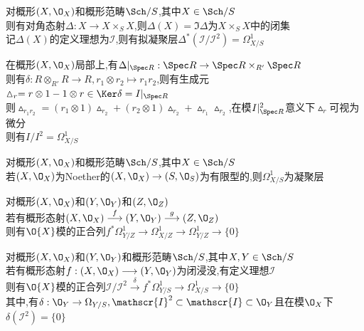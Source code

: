 \begin{dingyi}
对概形$(X,\O_{X})$和概形范畴$\Sch/S$,其中$X\in \Sch/S$\\
则有对角态射$\Delta:X\to X\times_{S}X$,则$\Delta(X)=\Im\Delta$为$X\times_{S}X$中的闭集\\
记$\Delta(X)$的定义理想为$\mathscr{I}$,则有拟凝聚层$\Delta^*(\mathscr{I}/\mathscr{I}^2)=\Omega_{X/S}^{1}$
\end{dingyi}

\begin{zhu}
在概形$(X,\O_{X})$局部上,有$\Delta|_{\Spec R}:\Spec R\to \Spec R\times_{R'}\Spec R$\\
则有$\delta:R\otimes_{R'}R\to R,r_1\otimes r_2\mapsto r_1r_2$,则有生成元$\vartriangle_{r}= r\otimes 1-1\otimes r\in\Ker \delta=I|_{\Spec R}$\\
则$\vartriangle_{r_1r_2}=(r_1\otimes1)\vartriangle_{r_2}+(r_2\otimes1)\vartriangle_{r_2}+\vartriangle_{r_1}\vartriangle_{r_2}$,在模$I|_{\Spec R}^2$意义下$\vartriangle_{r}$可视为微分\\
则有$I/I^2=\Omega_{X/S}^{1}$
\end{zhu}

\begin{dingli}
对概形$(X,\O_{X})$和概形范畴$\Sch/S$,其中$X\in \Sch/S$\\
若$(X,\O_{X})$为Noether的$(X,\O_{X})\to (S,\O_{S})$为有限型的,则$\Omega_{X/S}^{1}$为凝聚层
\end{dingli}

\begin{dingli}
对概形$(X,\O_{X})$和$(Y,\O_{Y})$和$(Z,\O_{Z})$\\
若有概形态射$(X,\O_{X})\stackrel{f}{\longrightarrow}(Y,\O_{Y})\stackrel{g}{\longrightarrow}(Z,\O_{Z})$\\
则有$\O{X}$模的正合列$f^{*}\Omega_{Y/Z}^{1}\longrightarrow\Omega_{X/Z}^{1}\longrightarrow\Omega_{Y/Z}^{1}\longrightarrow\{0\}$
\end{dingli}

\begin{dingli}
对概形$(X,\O_{X})$和$(Y,\O_{Y})$和概形范畴$\Sch/S$,其中$X,Y\in \Sch/S$\\
若有概形态射$f:(X,\O_{X})\longrightarrow(Y,\O_{Y})$为闭浸没,有定义理想$\mathscr{I}$\\
则有$\O{X}$模的正合列$\mathscr{I}/\mathscr{I}^2\stackrel{\delta}{\longrightarrow}f^{*}\Omega_{Y/S}^{1}\longrightarrow\Omega_{X/S}^{1}\longrightarrow\{0\}$\\
其中,有$\delta:\O_{Y}\to\Omega_{Y/S},\mathscr{I}^2\subset \mathscr{I}\subset \O_{Y}$且在模$\O_{X}$下$\delta(\mathscr{I}^2)=\{0\}$
\end{dingli}

